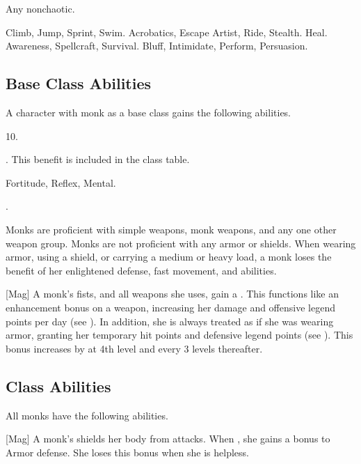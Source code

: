      Any nonchaotic.

     Climb, Jump, Sprint, Swim.
     Acrobatics, Escape Artist, Ride, Stealth.
     Heal.
     Awareness, Spellcraft, Survival.
     Bluff, Intimidate, Perform, Persuasion.

    \subsection{Base Class Abilities}
        A character with monk as a base class gains the following abilities.

         10.

         . This benefit is included in the class table.

          Fortitude,  Reflex,  Mental.

         .

        Monks are proficient with simple weapons, monk weapons, and any one other weapon group.
        Monks are not proficient with any armor or shields.
        When wearing armor, using a shield, or carrying a medium or heavy load, a monk loses the benefit of her enlightened defense, fast movement, and \ki abilities.

        [Mag] A monk's fists, and all weapons she uses, gain a  .
        This functions like an enhancement bonus on a weapon, increasing her damage and offensive legend points per day (see ).
        In addition, she is always treated as if she was wearing  armor, granting her temporary hit points and defensive legend points (see ).
        This bonus increases by  at 4th level and every 3 levels thereafter.

    \subsection{Class Abilities}
        All monks have the following abilities.

        [Mag]
        A monk's \ki shields her body from attacks.
        When \monkunencumbered, she gains a  bonus to Armor defense.
        She loses this bonus when she is helpless.

